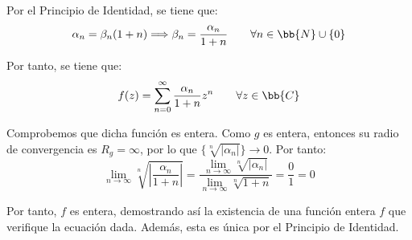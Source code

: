 \documentclass[12pt]{article}
\begin{document}
\begin{ejercicio}[3.5 puntos]
        Por el Principio de Identidad, se tiene que:
        \begin{equation*}
            \alpha_n = \beta_n(1+n)\Longrightarrow \beta_n = \frac{\alpha_n}{1+n} \qquad \forall n\in\bb{N}\cup \{0\}
        \end{equation*}

        Por tanto, se tiene que:
        \begin{equation*}
            f(z) = \sum_{n=0}^{\infty} \frac{\alpha_n}{1+n} z^n \qquad \forall z\in\bb{C}
        \end{equation*}

        Comprobemos que dicha función es entera. Como $g$ es entera, entonces su radio de convergencia es $R_g=\infty$, por lo que $\{\sqrt[n]{|\alpha_n|}\}\to 0$. Por tanto:
        \begin{equation*}
            \lim_{n\to\infty} \sqrt[n]{\left|\frac{\alpha_n}{1+n}\right|} = \dfrac{\lim_{n\to\infty} \sqrt[n]{|\alpha_n|}}{\lim_{n\to\infty} \sqrt[n]{1+n}} = \dfrac{0}{1} = 0
        \end{equation*}

        Por tanto, $f$ es entera, demostrando así la existencia de una función entera $f$ que verifique la ecuación dada. Además, esta es única por el Principio de Identidad.
    \end{ejercicio}
\end{document}
